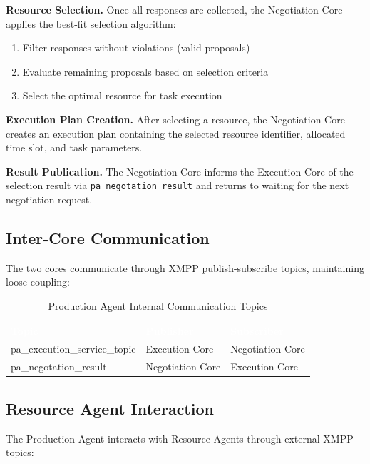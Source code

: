 \textbf{Resource Selection.} Once all responses are collected, the Negotiation Core applies the best-fit selection algorithm:
\begin{enumerate}
    \item Filter responses without violations (valid proposals)
    \item Evaluate remaining proposals based on selection criteria
    \item Select the optimal resource for task execution
\end{enumerate}

\textbf{Execution Plan Creation.} After selecting a resource, the Negotiation Core creates an execution plan containing the selected resource identifier, allocated time slot, and task parameters.

\textbf{Result Publication.} The Negotiation Core informs the Execution Core of the selection result via \texttt{pa\_negotation\_result} and returns to waiting for the next negotiation request.

\subsection{Inter-Core Communication}

The two cores communicate through \ac{XMPP} publish-subscribe topics, maintaining loose coupling:

\begin{table}[ht]
\centering
\caption{Production Agent Internal Communication Topics}
\label{tab:internal_topics}
\begin{tabular}{lll}
\toprule
\rowcolor{headerblue}
\textcolor{white}{Topic} & \textcolor{white}{Publisher} & \textcolor{white}{Subscriber} \\
\midrule
pa\_execution\_service\_topic & Execution Core & Negotiation Core \\
pa\_negotation\_result & Negotiation Core & Execution Core \\
\bottomrule
\end{tabular}
\end{table}
\subsection{Resource Agent Interaction}

The Production Agent interacts with Resource Agents through external \ac{XMPP} topics:

